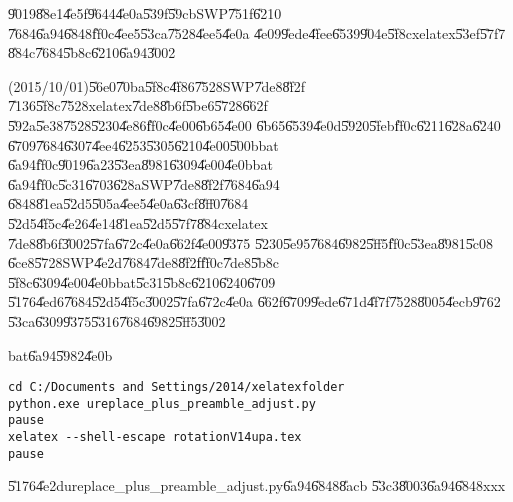 \U{9019}\U{88e1}\U{4e5f}\U{9644}\U{4e0a}\U{539f}\U{59cb}SWP\U{751f}\U{6210}%
\U{7684}\U{6a94}\U{6848}\U{ff0c}\U{4ee5}\U{53ca}\U{7528}\U{4ee5}\U{4e0a}%
\U{4e09}\U{9ede}\U{4fee}\U{6539}\U{904e}\U{5f8c}xelatex\U{53ef}\U{57f7}%
\U{884c}\U{7684}\U{5b8c}\U{6210}\U{6a94}\U{3002}

\bigskip

(2015/10/01)\U{56e0}\U{70ba}\U{5f8c}\U{4f86}\U{7528}SWP\U{7de8}\U{8f2f}%
\U{7136}\U{5f8c}\U{7528}xelatex\U{7de8}\U{8b6f}\U{5be6}\U{5728}\U{662f}%
\U{592a}\U{5e38}\U{7528}\U{5230}\U{4e86}\U{ff0c}\U{4e00}\U{6b65}\U{4e00}%
\U{6b65}\U{6539}\U{4e0d}\U{5920}\U{5feb}\U{ff0c}\U{6211}\U{628a}\U{6240}%
\U{6709}\U{7684}\U{6307}\U{4ee4}\U{6253}\U{5305}\U{6210}\U{4e00}\U{500b}bat%
\U{6a94}\U{ff0c}\U{9019}\U{6a23}\U{53ea}\U{8981}\U{6309}\U{4e00}\U{4e0b}bat%
\U{6a94}\U{ff0c}\U{5c31}\U{6703}\U{628a}SWP\U{7de8}\U{8f2f}\U{7684}\U{6a94}%
\U{6848}\U{81ea}\U{52d5}\U{505a}\U{4ee5}\U{4e0a}\U{63cf}\U{8ff0}\U{7684}%
\U{52d5}\U{4f5c}\U{4e26}\U{4e14}\U{81ea}\U{52d5}\U{57f7}\U{884c}xelatex%
\U{7de8}\U{8b6f}\U{3002}\U{57fa}\U{672c}\U{4e0a}\U{662f}\U{4e00}\U{9375}%
\U{5230}\U{5e95}\U{7684}\U{6982}\U{5ff5}\U{ff0c}\U{53ea}\U{8981}\U{5c08}%
\U{6ce8}\U{5728}SWP\U{4e2d}\U{7684}\U{7de8}\U{8f2f}\U{ff0c}\U{7de8}\U{5b8c}%
\U{5f8c}\U{6309}\U{4e00}\U{4e0b}bat\U{5c31}\U{5b8c}\U{6210}\U{6240}\U{6709}%
\U{5176}\U{4ed6}\U{7684}\U{52d5}\U{4f5c}\U{3002}\U{57fa}\U{672c}\U{4e0a}%
\U{662f}\U{6709}\U{9ede}\U{671d}\U{4f7f}\U{7528}\U{8005}\U{4ecb}\U{9762}%
\U{53ca}\U{6309}\U{9375}\U{5316}\U{7684}\U{6982}\U{5ff5}\U{3002}

bat\U{6a94}\U{5982}\U{4e0b}

\begin{mdframed}[leftline=false, rightline=false,backgroundcolor=bg]
\begin{verbatim}
cd C:/Documents and Settings/2014/xelatexfolder
python.exe ureplace_plus_preamble_adjust.py 
pause
xelatex --shell-escape rotationV14upa.tex
pause
\end{verbatim}
\end{mdframed}

\U{5176}\U{4e2d}ureplace\_plus\_preamble\_adjust.py\U{6a94}\U{6848}\U{8acb}%
\U{53c3}\U{8003}\U{6a94}\U{6848}xxx

\clearpage%
